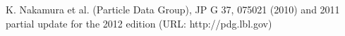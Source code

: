\begin{thebibliography}{99}
 

K. Nakamura et al. (Particle Data Group), JP G 37, 075021 (2010) and 2011 partial update for the 2012 edition (URL: http://pdg.lbl.gov)


\end{thebibliography}




